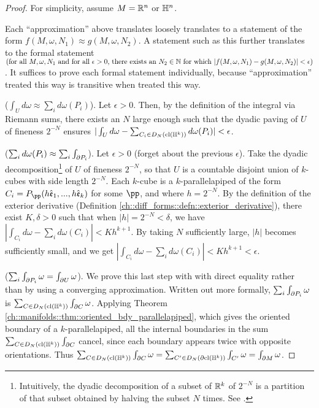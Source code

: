 \begin{proof}
    For simplicity, assume $M = \mathbb{R}^n$ or $\mathbb{H}^n$.
    
    Each ``approximation'' above translates loosely translates to a statement of the form $f(M, \omega, N_1) \approx g(M, \omega, N_2)$. A statement such as this further translates to the formal statement \\ $(\text{for all $M, \omega, N_1$ and for all $\epsilon > 0$, there exists an $N_2 \in \mathbb{N}$ for which } |f(M, \omega, N_1) - g(M, \omega, N_2)| < \epsilon)$. It suffices to prove each formal statement individually, because ``approximation'' treated this way is transitive when treated this way.
    
    ($\int_U d \omega \approx \sum_i d \omega(P_i)$). Let $\epsilon > 0$. Then, by the definition of the integral via Riemann sums, there exists an $N$ large enough such that the dyadic paving of $U$ of fineness $2^{-N}$ ensures $|\int_U d \omega - \sum_{C_i \in D_N(\text{cl}(\mathbb{H}^k))} d \omega(P_i)| < \epsilon$.
    
    ($\sum_i d \omega(P_i) \approx \sum_i \int_{\partial P_i}$). Let $\epsilon > 0$ (forget about the previous $\epsilon$). Take the dyadic decomposition\footnote{Intuitively, the dyadic decomposition of a subset of $\mathbb{R}^k$ of $2^{-N}$ is a partition of that subset obtained by halving the subset $N$ times. See \cite[p. 356]{book::Hubbard}.} of $U$ of fineness $2^{-N}$, so that $U$ is a countable disjoint union of $k$-cubes with side length $2^{-N}$. Each $k$-cube is a $k$-parallelapiped of the form $C_i = P_\pp(h \see_1, ..., h \see_k)$ for some $\pp$, and where $h = 2^{-N}$. By the definition of the exterior derivative (Definition \ref{ch::diff_forms::defn::exterior_derivative}), there exist $K, \delta > 0$ such that when $|h| = 2^{-N} < \delta$, we have $|\int_{C_i} d \omega - \sum_i d \omega(C_i)| < Kh^{k + 1}$. By taking $N$ sufficiently large, $|h|$ becomes sufficiently small, and we get $|\int_{C_i} d \omega - \sum_i d \omega(C_i)| < Kh^{k + 1} < \epsilon$.
    
    ($\sum_i \int_{\partial P_i} \omega = \int_{\partial U} \omega$). We prove this last step with with direct equality rather than by using a converging approximation. Written out more formally, $\sum_i \int_{\partial P_i} \omega$ is $\sum_{C \in D_N(\text{cl}(\mathbb{H}^k))} \int_{\partial C} \omega$. Applying Theorem \ref{ch::manifolds::thm::oriented_bdy_parallelapiped}, which gives the oriented boundary of a $k$-parallelapiped, all the internal boundaries in the sum $\sum_{C \in D_N(\text{cl}(\mathbb{H}^k))} \int_{\partial C}$ cancel, since each boundary appears twice with opposite orientations.  Thus $\sum_{C \in D_N(\text{cl}(\mathbb{H}^k))} \int_{\partial C} \omega = \sum_{C' \in D_N(\partial \text{cl}(\mathbb{H}^k))} \int_{C'} \omega = \int_{\partial M} \omega$.
\end{proof}

